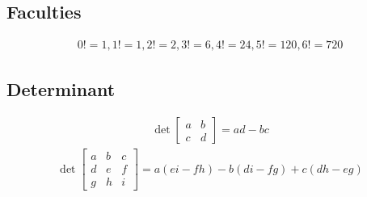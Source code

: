 \subsection{Faculties}
\begin{align*}
    0! = 1, 1! = 1, 2! = 2, 3! = 6, 4! = 24, 5! = 120, 6! = 720
\end{align*}

\subsection{Determinant}

\begin{align*}
	\det
	\begin{bmatrix}
		a & b \\
		c & d
	\end{bmatrix}
	=
	ad-bc
\end{align*}
\begin{align*}
	\det
	\begin{bmatrix}
		a & b & c \\
		d & e & f \\
		g & h & i
	\end{bmatrix}
	=
	a(ei-fh)-b(di-fg)+c(dh-eg)
\end{align*}


